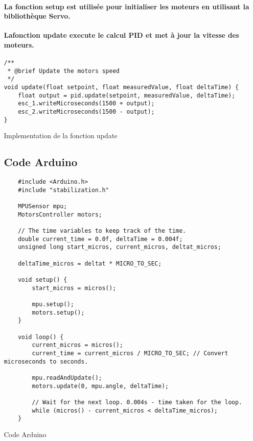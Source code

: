 \paragraph{La fonction setup est utilisée pour initialiser les moteurs en utilisant la bibliothèque Servo.}

\paragraph{Lafonction update execute le calcul PID et met à jour la vitesse des moteurs.}

\begin{listing}[!htpb]
	\begin{verbatim}
/**
 * @brief Update the motors speed
 */
void update(float setpoint, float measuredValue, float deltaTime) {
	float output = pid.update(setpoint, measuredValue, deltaTime);
	esc_1.writeMicroseconds(1500 + output);
	esc_2.writeMicroseconds(1500 - output);
}
	\end{verbatim}
	\caption{Implementation de la fonction update}
	\label{listing:motor-update}
\end{listing}

\subsection{Code Arduino}



\begin{listing}[!htpb]
	\begin{verbatim}
	#include <Arduino.h>
	#include "stabilization.h"

	MPUSensor mpu;
	MotorsController motors;

	// The time variables to keep track of the time.
	double current_time = 0.0f, deltaTime = 0.004f;
	unsigned long start_micros, current_micros, deltat_micros;

	deltaTime_micros = deltat * MICRO_TO_SEC;

	void setup() {
		start_micros = micros();

		mpu.setup();
		motors.setup();
	}

	void loop() {
		current_micros = micros();
		current_time = current_micros / MICRO_TO_SEC; // Convert microseconds to seconds.

		mpu.readAndUpdate();
		motors.update(0, mpu.angle, deltaTime);

		// Wait for the next loop. 0.004s - time taken for the loop.
		while (micros() - current_micros < deltaTime_micros);
	}
	\end{verbatim}
	\caption{Code Arduino}
	\label{listing:arduino-code}
\end{listing}
